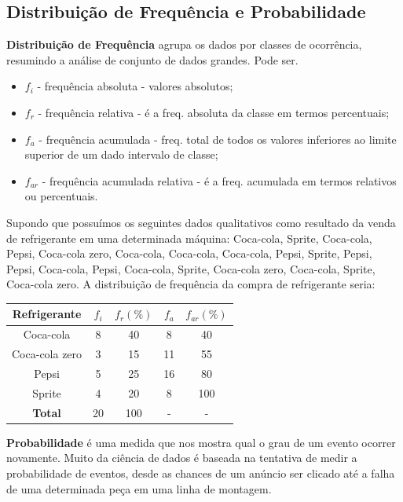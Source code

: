 \subsection{Distribuição de Frequência e Probabilidade}
\textbf{Distribuição de Frequência} agrupa os dados por classes de ocorrência, resumindo a análise de conjunto de dados grandes. Pode ser.
\begin{itemize}
	\item $f_{i}$ - frequência absoluta - valores absolutos;
	\item $f_{r}$ - frequência relativa - é a freq. absoluta da classe em termos percentuais;
	\item $f_{a}$ - frequência acumulada - freq. total de todos os valores inferiores ao limite superior de um dado intervalo de classe;
	\item $f_{ar}$ - frequência acumulada relativa - é a freq. acumulada em termos relativos ou percentuais.
\end{itemize}

Supondo que possuímos os seguintes dados qualitativos como resultado da venda de refrigerante em uma determinada máquina: Coca-cola, Sprite, Coca-cola, Pepsi, Coca-cola zero, Coca-cola, Coca-cola, Coca-cola, Pepsi, Sprite, Pepsi, Pepsi, Coca-cola, Pepsi, Coca-cola, Sprite, Coca-cola zero, Coca-cola, Sprite, Coca-cola zero. A distribuição de frequência da compra de refrigerante seria:
\begin{center}
	\begin{tabular}{ c|c|c|c|c } 
		\hline
		\textbf{Refrigerante} & \textbf{$f_{i}$} & \textbf{$f_{r}(\%)$} & \textbf{$f_{a}$} & \textbf{$f_{ar}(\%)$} \\ 
		\hline
		Coca-cola & 8 & 40 & 8 & 40 \\ 
		Coca-cola zero & 3 & 15 & 11 & 55 \\ 
		Pepsi & 5 & 25 & 16 & 80 \\ 
		Sprite & 4 & 20 & 8 & 100 \\ 
		\hline
		\textbf{Total} & 20 & 100 & - & -\\ 
		\hline
	\end{tabular}
\end{center}

\textbf{Probabilidade} é uma medida que nos mostra qual o grau de um evento ocorrer novamente. Muito da ciência de dados é baseada na tentativa de medir a probabilidade de eventos, desde as chances de um anúncio ser clicado até a falha de uma determinada peça em uma linha de montagem.

